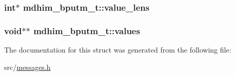 \hypertarget{structmdhim__bputm__t_a915478fbead386af153b4b3989ff7fb6}{
\subsubsection[{value\-\_\-lens}]{\setlength{\rightskip}{0pt plus 5cm}int$\ast$ mdhim\-\_\-bputm\-\_\-t\-::value\-\_\-lens}}\label{d1/ddf/structmdhim__bputm__t_a915478fbead386af153b4b3989ff7fb6}
\hypertarget{structmdhim__bputm__t_a1b908d082b136370db7574dc25d44853}{
\subsubsection[{values}]{\setlength{\rightskip}{0pt plus 5cm}void$\ast$$\ast$ mdhim\-\_\-bputm\-\_\-t\-::values}}\label{d1/ddf/structmdhim__bputm__t_a1b908d082b136370db7574dc25d44853}


The documentation for this struct was generated from the following file\-:\begin{DoxyCompactItemize}
\item 
src/\hyperlink{messages_8h}{messages.\-h}\end{DoxyCompactItemize}
